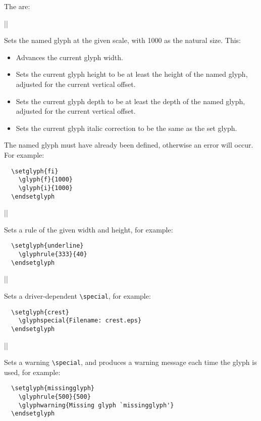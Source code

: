 \documentclass[a4paper]{ltxguide}
\begin{document}
The  are:

\begin{decl}
  |\glyph|
\end{decl}
Sets the named glyph  at the given scale, with 1000 as the
natural size.  This:
\begin{itemize}
\item Advances the current glyph width.
\item Sets the current glyph height to be at least the height of the
  named glyph, adjusted for the current vertical offset.
\item Sets the current glyph depth to be at least the depth of the
  named glyph, adjusted for the current vertical offset.
\item Sets the current glyph italic correction to be the same as the
  set glyph.
\end{itemize}
The named glyph must have already been defined, otherwise an error
will occur.  For example:
\begin{verbatim}
  \setglyph{fi}
    \glyph{f}{1000}
    \glyph{i}{1000}
  \endsetglyph
\end{verbatim}

\begin{decl}
  |\glyphrule|
\end{decl}
Sets a rule of the given width and height, for example:
\begin{verbatim}
  \setglyph{underline}
    \glyphrule{333}{40}
  \endsetglyph
\end{verbatim}

\begin{decl}
  |\glyphspecial|
\end{decl}
Sets a driver-dependent \verb|\special|, for example:
\begin{verbatim}
  \setglyph{crest}
    \glyphspecial{Filename: crest.eps}
  \endsetglyph
\end{verbatim}

\begin{decl}
  |\glyphwarning|
\end{decl}
Sets a warning \verb|\special|, and produces a warning message each
time the glyph is used, for example:
\begin{verbatim}
  \setglyph{missingglyph}
    \glyphrule{500}{500}
    \glyphwarning{Missing glyph `missingglyph'}
  \endsetglyph
\end{verbatim}
\end{document}

